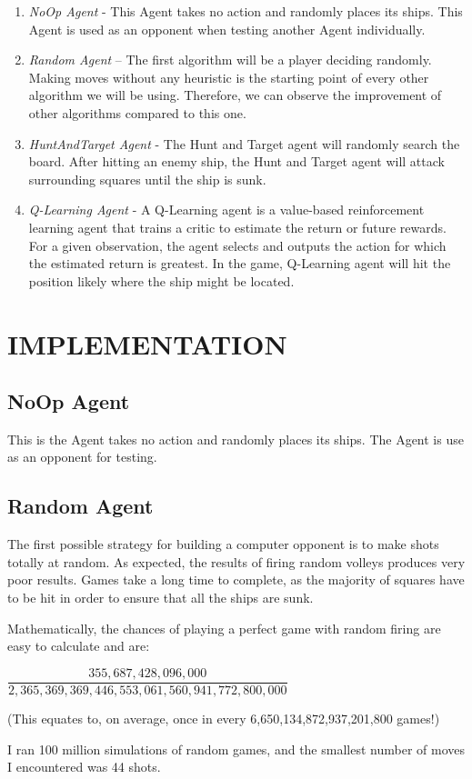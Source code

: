 \documentclass{article}
\begin{document}
\begin{multicols}{2}
\begin{enumerate}
	\item \textit{NoOp Agent} - This Agent takes no action and randomly places its ships.  This Agent is used as an opponent when testing another Agent individually.
    \item \textit{Random Agent} – The first algorithm will be a player deciding randomly. Making moves without any heuristic is the starting point of every other algorithm we will be using. Therefore, we can observe the improvement of other algorithms compared to this one.
    \item \textit{HuntAndTarget Agent} - The Hunt and Target agent will randomly search the board. After hitting an enemy ship, the Hunt and Target agent will attack surrounding squares until the ship is sunk.    
    \item \textit{Q-Learning Agent} - A Q-Learning agent is a value-based reinforcement learning agent that trains a critic to estimate the return or future rewards. For a given observation, the agent selects and outputs the action for which the estimated return is greatest. In the game, Q-Learning agent will hit the position likely where the ship might be located.
    \end{enumerate}
\section{IMPLEMENTATION}
\subsection{NoOp Agent}
	This is the Agent takes no action and randomly places its ships. The Agent is use as an opponent for testing.
\subsection{Random Agent}
The first possible strategy for building a computer opponent is to make shots totally at random. As expected, the results of firing random volleys produces very poor results. Games take a long time to complete, as the majority of squares have to be hit in order to ensure that all the ships are sunk.

Mathematically, the chances of playing a perfect game with random firing are easy to calculate and are:
\begin{center}
$\dfrac{355,687,428,096,000}{2,365,369,369,446,553,061,560,941,772,800,000}$

(This equates to, on average, once in every 6,650,134,872,937,201,800 games!)
\end{center}
I ran 100 million simulations of random games, and the smallest number of moves I encountered was 44 shots.


\end{multicols}
\end{document}
